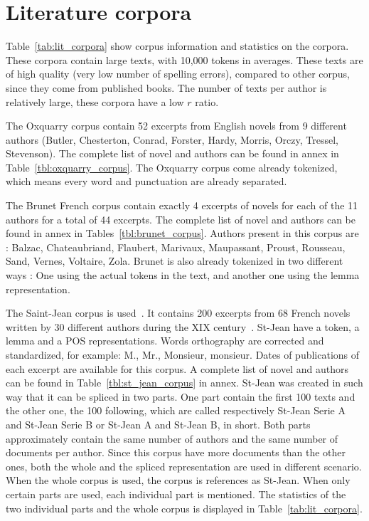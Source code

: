\section{Literature corpora \label{sec:lit_corpus}}

Table~\ref{tab:lit_corpora} show corpus information and statistics on the corpora.
These corpora contain large texts, with 10,000 tokens in averages.
These texts are of high quality (very low number of spelling errors), compared to other corpus, since they come from published books.
The number of texts per author is relatively large, these corpora have a low $r$ ratio.

The Oxquarry corpus contain 52 excerpts from English novels from 9 different authors (Butler, Chesterton, Conrad, Forster, Hardy, Morris, Orczy, Tressel, Stevenson).
The complete list of novel and authors can be found in annex in Table~\ref{tbl:oxquarry_corpus}.
The Oxquarry corpus come already tokenized, which means every word and punctuation are already separated.

The Brunet French corpus contain exactly 4 excerpts of novels for each of the 11 authors for a total of 44 excerpts.
The complete list of novel and authors can be found in annex in Tables~\ref{tbl:brunet_corpus}.
Authors present in this corpus are : Balzac, Chateaubriand, Flaubert, Marivaux, Maupassant, Proust, Rousseau, Sand, Vernes, Voltaire, Zola.
Brunet is also already tokenized in two different ways : One using the actual tokens in the text, and another one using the lemma representation.

The Saint-Jean corpus is used~\cite{unine_corpus}.
It contains 200 excerpts from 68 French novels written by 30 different authors during the XIX century~\cite{st_jean}.
St-Jean have a token, a lemma and a POS representations.
Words orthography are corrected and standardized, for example: M., Mr., Monsieur, monsieur.
Dates of publications of each excerpt are available for this corpus.
A complete list of novel and authors can be found in Table~\ref{tbl:st_jean_corpus} in annex.
St-Jean was created in such way that it can be spliced in two parts.
One part contain the first 100 texts and the other one, the 100 following, which are called respectively St-Jean Serie A and St-Jean Serie B or St-Jean A and St-Jean B, in short.
Both parts approximately contain the same number of authors and the same number of documents per author.
Since this corpus have more documents than the other ones, both the whole and the spliced representation are used in different scenario.
When the whole corpus is used, the corpus is references as St-Jean.
When only certain parts are used, each individual part is mentioned.
The statistics of the two individual parts and the whole corpus is displayed in Table~\ref{tab:lit_corpora}.

